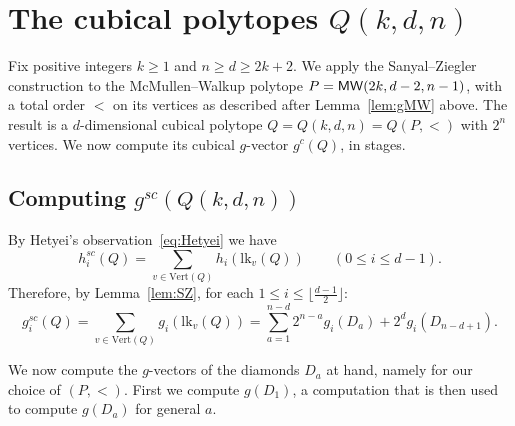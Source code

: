 \documentclass[a4paper,leqno]{article}
\theoremstyle{definition}
\newcommand{\lk}{\mathrm{lk}}
\newcommand{\vertices}{\mathrm{Vert}}
\newcommand{\gc}{g^c}
\newcommand{\hsc}{h^{sc}}
\newcommand{\gsc}{g^{sc}}
\newcommand{\mw}{{\sf MW}}
\begin{document}
\section{The cubical polytopes $Q(k,d,n)$}\label{sec:Q}

Fix positive integers $k \ge 1$ and $n \ge d \ge 2k+2$.
We apply the Sanyal--Ziegler construction to the McMullen--Walkup polytope $P=\mw(2k,d-2,n-1)$, with a total order $<$ on its vertices as described after Lemma~\ref{lem:gMW} above.
The result is a $d$-dimensional cubical polytope $Q=Q(k,d,n)=Q(P,<)$ with $2^n$ vertices.
We now compute its cubical $g$-vector $\gc(Q)$, in stages.


\subsection{Computing $\gsc(Q(k,d,n))$}

By Hetyei's observation~\eqref{eq:Hetyei} we have
\begin{equation*}
\hsc_i(Q)=\sum_{v\in \vertices(Q)}h_i(\lk_v(Q))
\qquad (0 \leq i \leq d-1).
\end{equation*}
Therefore, by Lemma~\ref{lem:SZ}, for each $1\leq i\leq \lfloor\frac{d-1}{2}\rfloor$:
\begin{equation}\label{eq:Q_g-vector}
\gsc_i(Q)
= \sum_{v\in \vertices(Q)} g_i(\lk_v(Q))
= \sum_{a=1}^{n-d} 2^{n-a} g_i(D_a) + 2^{d} g_i(D_{n-d+1}).
\end{equation}

We now compute the $g$-vectors of the diamonds $D_a$ at hand, namely for our choice of $(P,<)$. First we compute $g(D_1)$, a computation that is then used to compute $g(D_a)$ for general $a$.
\end{document}
